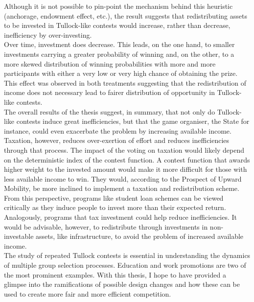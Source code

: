Although it is not possible to pin-point the mechanism behind this heuristic (anchorage, endowment effect, etc.), the result suggests that redistributing assets to be invested in Tullock-like contests would increase, rather than decrease, inefficiency by over-investing.\\  

Over time, investment does decrease. This leads, on the one hand, to smaller investments carrying a greater probability of winning and, on the other, to a more skewed distribution of winning probabilities with more and more participants with either a very low or very high chance of obtaining the prize. This effect was observed in both treatments suggesting that the redistribution of income does not necessary lead to fairer distribution of opportunity in Tullock-like contests.\\

The overall results of the thesis suggest, in summary, that not only do Tullock-like contests induce great inefficiencies, but that the game organiser, the State for instance, could even exacerbate the problem by increasing available income. Taxation, however, reduces over-exertion of effort and reduces inefficiencies through that process. The impact of the voting on taxation would likely depend on the deterministic index of the contest function. A contest function that awards higher weight to the invested amount would make it more difficult for those with less available income to win. They would, according to the Prospect of Upward Mobility, be more inclined to implement a taxation and redistribution scheme.\\

From this perspective, programs like student loan schemes can be viewed critically as they induce people to invest more than their expected return. Analogously, programs that tax investment could help reduce inefficiencies. It would be advisable, however, to redistribute through investments in non-investable assets, like infrastructure, to avoid the problem of increased available income.\\

The study of repeated Tullock contests is essential in understanding the dynamics of multiple group selection processes. Education and work promotions are two of the most prominent examples. With this thesis, I hope to have provided a glimpse into the ramifications of possible design changes and how these can be used to create more fair and more efficient competition.